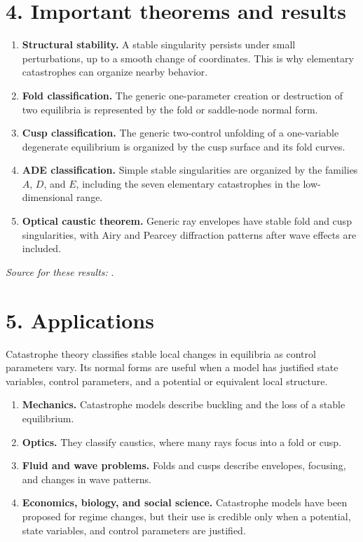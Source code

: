 \section*{4. Important theorems and results}
\begin{enumerate}[leftmargin=*,itemsep=0.35em]

\item \textbf{Structural stability.} A stable singularity persists under small perturbations, up to a smooth change of coordinates. This is why elementary catastrophes can organize nearby behavior.

\item \textbf{Fold classification.} The generic one-parameter creation or destruction of two equilibria is represented by the fold or saddle-node normal form.

\item \textbf{Cusp classification.} The generic two-control unfolding of a one-variable degenerate equilibrium is organized by the cusp surface and its fold curves.

\item \textbf{ADE classification.} Simple stable singularities are organized by the families $A$, $D$, and $E$, including the seven elementary catastrophes in the low-dimensional range.

\item \textbf{Optical caustic theorem.} Generic ray envelopes have stable fold and cusp singularities, with Airy and Pearcey diffraction patterns after wave effects are included.
\end{enumerate}
\noindent\emph{Source for these results:} \cite{catastrophe_theory_ref1}.

\section*{5. Applications}
Catastrophe theory classifies stable local changes in equilibria as control parameters vary. Its normal forms are useful when a model has justified state variables, control parameters, and a potential or equivalent local structure.
\begin{enumerate}[leftmargin=*,itemsep=0.35em]
\item \textbf{Mechanics.} Catastrophe models describe buckling and the loss of a stable equilibrium.
\item \textbf{Optics.} They classify caustics, where many rays focus into a fold or cusp.
\item \textbf{Fluid and wave problems.} Folds and cusps describe envelopes, focusing, and changes in wave patterns.
\item \textbf{Economics, biology, and social science.} Catastrophe models have been proposed for regime changes, but their use is credible only when a potential, state variables, and control parameters are justified.
\end{enumerate}

